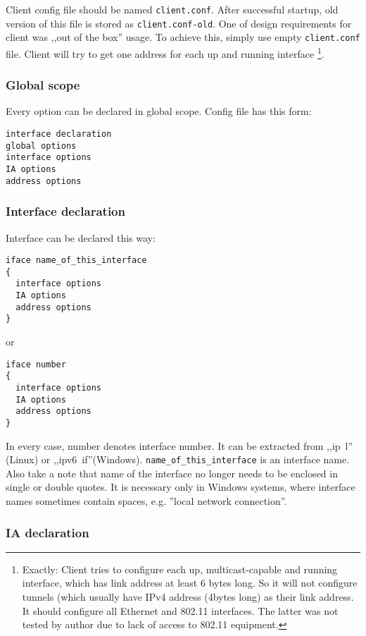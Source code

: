 Client config file should be named \verb+client.conf+. After
successful startup, old version of this file is stored as
\verb+client.conf-old+. One of design requirements for client was
,,out of the box'' usage. To achieve this, simply use empty
\verb+client.conf+ file. Client will try to get one address for each up and
running interface \footnote{Exactly: Client tries to configure each
  up, multicast-capable and running interface, which has link address
  at least 6 bytes long. So it will not configure tunnels (which
  usually have IPv4 address (4bytes long) as their link address. It
  should configure all Ethernet and 802.11 interfaces. The latter was
  not tested by author due to lack of access to 802.11 equipment.}.

\subsubsection{Global scope}

Every option can be declared in global scope.
Config file has this form:

\begin{verbatim}
interface declaration
global options
interface options
IA options
address options
\end{verbatim}

\subsubsection{Interface declaration}

Interface can be declared this way:
\begin{verbatim}
iface name_of_this_interface
{
  interface options
  IA options
  address options        
}
\end{verbatim}

or 

\begin{verbatim}
iface number 
{
  interface options
  IA options
  address options        
}
\end{verbatim}

In every case, number denotes interface number. It can be extracted
from ,,ip~l'' (Linux) or
,,ipv6~if''(Windows). \verb+name_of_this_interface+ is an interface
name.  Also take a note that name of the interface
no longer needs to be enclosed in single or double quotes. It is
necessary only in Windows systems, where interface names sometimes
contain spaces, e.g. ''local network connection''.

\subsubsection{IA declaration}

